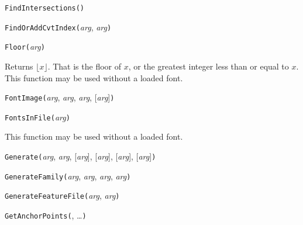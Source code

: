 

\texttt{FindIntersections(}\texttt{)}



\texttt{FindOrAddCvtIndex(}\textit{arg}, \textit{arg}\texttt{)}



\texttt{Floor(}\textit{arg}\texttt{)}

Returns $\lfloor x \rfloor$.  That is the floor of $x$, or the greatest
integer less than or equal to $x$.  This function may be used without a
loaded font.



\texttt{FontImage(}\textit{arg}, \textit{arg}, \textit{arg}, [\textit{arg}]\texttt{)}



\texttt{FontsInFile(}\textit{arg}\texttt{)}

This function may be used without a loaded font.



\texttt{Generate(}\textit{arg}, \textit{arg}, [\textit{arg}], [\textit{arg}], [\textit{arg}], [\textit{arg}]\texttt{)}



\texttt{GenerateFamily(}\textit{arg}, \textit{arg}, \textit{arg}, \textit{arg}\texttt{)}



\texttt{GenerateFeatureFile(}\textit{arg}, \textit{arg}\texttt{)}



\texttt{GetAnchorPoints(}, \ldots\texttt{)}


